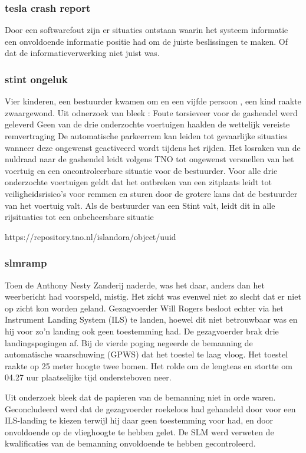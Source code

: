 \subsubsection{tesla crash report}
Door een softwarefout zijn er situaties ontstaan waarin het systeem informatie een onvoldoende informatie positie had om de juiste beslissingen te maken. Of dat de informatieverwerking niet juist was.




\subsubsection{stint ongeluk}
Vier kinderen, een bestuurder kwamen om en een vijfde persoon , een kind raakte zwaargewond. Uit odnerzoek van bleek :
Foute torsieveer voor de gashendel werd geleverd
Geen van de drie onderzochte voertuigen haalden de wettelijk vereiste remvertraging
De automatische parkeerrem kan leiden tot gevaarlijke situaties wanneer deze ongewenst geactiveerd wordt tijdens het rijden. 
Het losraken van de nuldraad naar de gashendel leidt volgens TNO tot ongewenst versnellen van het voertuig en een oncontroleerbare situatie voor de bestuurder.
Voor alle drie onderzochte voertuigen geldt dat het ontbreken van een zitplaats leidt tot veiligheidsrisico’s voor remmen en sturen door de grotere kans dat de bestuurder van het voertuig valt. Als de bestuurder van een Stint valt, leidt dit in alle rijsituaties tot een onbeheersbare situatie


https://repository.tno.nl/islandora/object/uuid%




\subsubsection{slmramp}
Toen de Anthony Nesty Zanderij naderde, was het daar, anders dan het weerbericht had voorspeld, mistig. Het zicht was evenwel niet zo slecht dat er niet op zicht kon worden geland. Gezagvoerder Will Rogers besloot echter via het Instrument Landing System (ILS) te landen, hoewel dit niet betrouwbaar was en hij voor zo'n landing ook geen toestemming had. De gezagvoerder brak drie landingspogingen af. Bij de vierde poging negeerde de bemanning de automatische waarschuwing (GPWS) dat het toestel te laag vloog. Het toestel raakte op 25 meter hoogte twee bomen. Het rolde om de lengteas en stortte om 04.27 uur plaatselijke tijd ondersteboven neer.

Uit onderzoek bleek dat de papieren van de bemanning niet in orde waren. 
Geconcludeerd werd dat de gezagvoerder roekeloos had gehandeld door voor een ILS-landing te kiezen terwijl hij daar geen toestemming voor had, en door onvoldoende op de vlieghoogte te hebben gelet. 
De SLM werd verweten de kwalificaties van de bemanning onvoldoende te hebben gecontroleerd.

